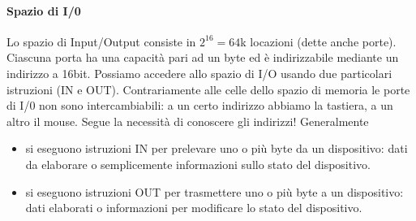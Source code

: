 \documentclass[11pt]{report}
\begin{document}
\paragraph{Spazio di I/0}
Lo spazio di Input/Output consiste in $2^{16}=64$k locazioni (dette anche porte). Ciascuna porta ha una capacità pari ad un byte ed è indirizzabile mediante un indirizzo a 16bit. Possiamo accedere allo spazio di I/O usando due particolari istruzioni (IN e OUT). Contrariamente alle celle dello spazio di memoria le porte di I/0 non sono intercambiabili: a un certo indirizzo abbiamo la tastiera, a un altro il mouse. Segue la necessità di conoscere gli indirizzi! Generalmente
\begin{itemize}
\item si eseguono istruzioni IN per prelevare uno o più byte da un dispositivo: dati da elaborare o semplicemente informazioni sullo stato del dispositivo.
\item si eseguono istruzioni OUT per trasmettere uno o più byte a un dispositivo: dati elaborati o informazioni per modificare lo stato del dispositivo.
\end{itemize}
\end{document}
